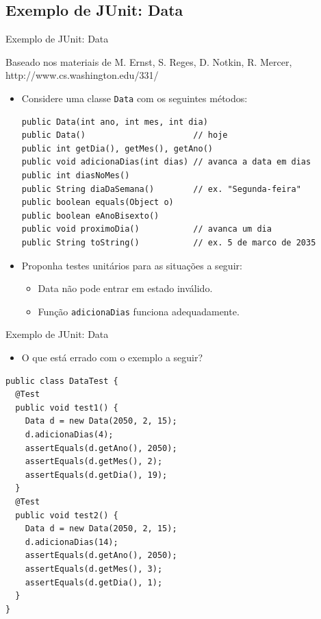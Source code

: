 \documentclass[handout]{beamer}
\begin{document}
\subsection{Exemplo de JUnit: Data}


\begin{frame}[fragile]{Exemplo de JUnit: Data}

{\tiny Baseado nos materiais de M. Ernst, S. Reges, D. Notkin, R. Mercer, http://www.cs.washington.edu/331/}

\begin{itemize}
\item Considere uma classe \lstinline|Data| com os seguintes métodos:
\begin{lstlisting}
public Data(int ano, int mes, int dia)
public Data()                      // hoje
public int getDia(), getMes(), getAno()
public void adicionaDias(int dias) // avanca a data em dias
public int diasNoMes()
public String diaDaSemana()        // ex. "Segunda-feira"
public boolean equals(Object o)
public boolean eAnoBisexto()
public void proximoDia()           // avanca um dia
public String toString()           // ex. 5 de marco de 2035
\end{lstlisting}

\item Proponha testes unitários para as situações a seguir:
\begin{itemize}
\item Data não pode entrar em estado inválido.
\item Função \lstinline|adicionaDias| funciona adequadamente.
\end{itemize}
\end{itemize}

\end{frame}


\begin{frame}[fragile]{Exemplo de JUnit: Data}

\begin{itemize}
\item O que está errado com o exemplo a seguir?
\end{itemize}
\vspace{-2mm}
\begin{lstlisting}
public class DataTest {
  @Test
  public void test1() {
    Data d = new Data(2050, 2, 15);
    d.adicionaDias(4);
    assertEquals(d.getAno(), 2050);
    assertEquals(d.getMes(), 2);
    assertEquals(d.getDia(), 19);
  }
  @Test
  public void test2() {
    Data d = new Data(2050, 2, 15);
    d.adicionaDias(14);
    assertEquals(d.getAno(), 2050);
    assertEquals(d.getMes(), 3);
    assertEquals(d.getDia(), 1);
  }
}
\end{lstlisting}

\end{frame}
\end{document}
